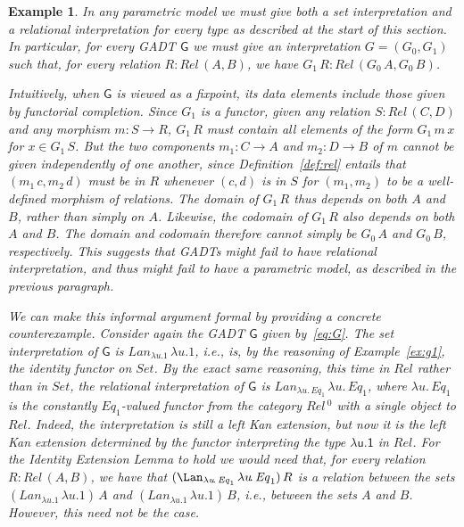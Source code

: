 \documentclass[submission,copyright,creativecommons]{eptcs}
\newtheorem{example}[thm]{Example}
\begin{document}
\begin{example}\label{ex:prim-par}
In any parametric model we must give both a set interpretation and a
relational interpretation for every type as described at the start of
this section. In particular, for every GADT $\mathsf{G}$ we must give
an interpretation $G = (G_0,G_1)$ such that, for every relation $R :
\mathit{Rel}\,(A, B)$, we have $G_1\,R : \mathit{Rel}\,(G_0\,A,
G_0\,B)$.

Intuitively, when $\mathsf{G}$ is viewed as a fixpoint, its data
elements include those given by functorial completion. Since $G_1$ is
a functor, given any relation $S : \mathit{Rel}\,(C, D)$ and any
morphism $m : S \to R$, $G_1\, R$ must contain all elements of the
form $G_1\,m\,x$ for $x \in G_1\,S$.  But the two components $m_1 : C
\to A$ and $m_2 : D \to B$ of $m$ cannot be given independently of one
another, since Definition~\ref{def:rel} entails that
$(m_1\,c, m_2\,d)$ must be in $R$ whenever $(c,d)$ is in $S$ for
$(m_1,m_2)$ to be a well-defined morphism of relations.  The domain of
$G_1\, R$ thus depends on both $A$ and $B$, rather than simply on $A$.
Likewise, the codomain of $G_1\,R$ also depends on both $A$ and $B$.
The domain and codomain therefore cannot simply be $G_0\, A$ and
$G_0\, B$, respectively.  This suggests that GADTs might fail to have
relational interpretation, and thus might fail to have a parametric
model, as described in the previous paragraph.

We can make this informal argument formal by providing a concrete
counterexample.  Consider again the GADT $\mathsf{G}$ given
by~\eqref{eq:G}. The set interpretation of $\mathsf{G}$ is
$\mathit{Lan}_{\lambda u\!. 1}\,\lambda u\!. 1$, i.e., is, by the
reasoning of Example~\ref{ex:g1}, the identity functor on
$\mathit{Set}$. By the exact same reasoning, this time in
$\mathit{Rel}$ rather than in $\mathit{Set}$, the relational
interpretation of $\mathsf{G}$ is $\mathit{Lan}_{\lambda
  u\!.\,\mathit{Eq}_1} \,\lambda u\!.\,\mathit{Eq}_1$, where $\lambda
u\!.\,\mathit{Eq}_1$ is the constantly $\mathit{Eq}_1$-valued functor
from the category $\mathit{Rel}\,^0$ with a single object to
$\mathit{Rel}$.  Indeed, the interpretation is still a left Kan
extension, but now it is the left Kan extension determined by the
functor interpreting the type $\mathsf{\lambda u\!. 1}$ in
$\mathit{Rel}$. For the Identity Extension Lemma to hold we would need
that, for every relation $R : \mathit{Rel}\,(A, B)$, we have that
$(\mathit{\Lan}_{\lambda u\!.\,\mathit{Eq}_1} \,\lambda
u\!.\,\mathit{Eq}_1)\, R$ is a relation between the sets
$(\mathit{Lan}_{\lambda u. 1}\,\lambda u\!. 1)\, A$ and
$(\mathit{Lan}_{\lambda u. 1}\,\lambda u\!. 1)\,B$, i.e., between the
sets $A$ and $B$. However,
this need not be the case.


\end{example}
\end{document}
